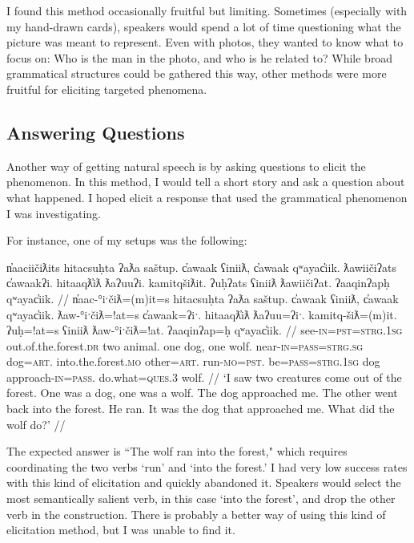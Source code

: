 I found this method occasionally fruitful but limiting. Sometimes (especially with my hand-drawn cards), speakers would spend a lot of time questioning what the picture was meant to represent. Even with photos, they wanted to know what to focus on: Who is the man in the photo, and who is he related to? While broad grammatical structures could be gathered this way, other methods were more fruitful for eliciting targeted phenomena.

\subsection{Answering Questions}

Another way of getting natural speech is by asking questions to elicit the phenomenon. In this method, I would tell a short story and ask a question about what happened. I hoped elicit a response that used the grammatical phenomenon I was investigating.

For instance, one of my setups was the following:

\ex \label{ex:wolfsetup}
\begingl
\glpreamble n̓aaciičiƛits hitacsuḥta ʔaƛa saštup. c̓awaak ʕiniiƛ, c̓awaak qʷayac̓iik. ƛawiičiʔats c̓awaakʔi. hitaaqƛ̓iƛ ƛaʔuuʔi. kamitqšiƛit. ʔuḥʔats ʕiniiƛ ƛawiičiʔat. ʔaaqinʔapḥ qʷayac̓iik. //
\gla n̓aac-°iˑčiƛ=(m)it=s hitacsuḥta ʔaƛa saštup. c̓awaak ʕiniiƛ, c̓awaak qʷayac̓iik. ƛaw-°iˑčiƛ=!at=s c̓awaak=ʔiˑ. hitaaqƛ̓iƛ ƛaʔuu=ʔiˑ. kamitq-šiƛ=(m)it. ʔuḥ=!at=s ʕiniiƛ ƛaw-°iˑčiƛ=!at. ʔaaqinʔap=ḥ qʷayac̓iik. //
\glb see-\textsc{in}=\textsc{pst}=\textsc{strg.1sg} out.of.the.forest.\textsc{dr} two animal. one dog, one wolf. near-\textsc{in}=\textsc{pass}=\textsc{strg.sg} dog=\textsc{art}. into.the.forest.\textsc{mo} other=\textsc{art}. run-\textsc{mo}=\textsc{pst}. be=\textsc{pass}=\textsc{strg.1sg} dog approach-\textsc{in}=\textsc{pass}. do.what=\textsc{ques.3} wolf. //
\glft `I saw two creatures come out of the forest. One was a dog, one was a wolf. The dog approached me. The other went back into the forest. He ran. It was the dog that approached me. What did the wolf do?' //
\endgl
\xe

The expected answer is ``The wolf ran into the forest," which requires coordinating the two verbs `run' and `into the forest.' I had very low success rates with this kind of elicitation and quickly abandoned it. Speakers would select the most semantically salient verb, in this case `into the forest', and drop the other verb in the construction. There is probably a better way of using this kind of elicitation method, but I was unable to find it.

